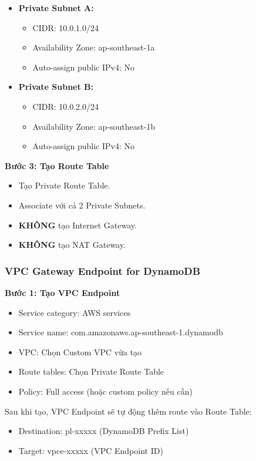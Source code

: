 \begin{itemize}
    \item \textbf{Private Subnet A:}
    \begin{itemize}
        \item CIDR: 10.0.1.0/24
        \item Availability Zone: ap-southeast-1a
        \item Auto-assign public IPv4: No
    \end{itemize}
    \item \textbf{Private Subnet B:}
    \begin{itemize}
        \item CIDR: 10.0.2.0/24
        \item Availability Zone: ap-southeast-1b
        \item Auto-assign public IPv4: No
    \end{itemize}
\end{itemize}

\textbf{Bước 3: Tạo Route Table}

\begin{itemize}
    \item Tạo Private Route Table.
    \item Associate với cả 2 Private Subnets.
    \item \textbf{KHÔNG} tạo Internet Gateway.
    \item \textbf{KHÔNG} tạo NAT Gateway.
\end{itemize}

\subsubsection{VPC Gateway Endpoint for DynamoDB}

\textbf{Bước 1: Tạo VPC Endpoint}

\begin{itemize}
    \item Service category: AWS services
    \item Service name: com.amazonaws.ap-southeast-1.dynamodb
    \item VPC: Chọn Custom VPC vừa tạo
    \item Route tables: Chọn Private Route Table
    \item Policy: Full access (hoặc custom policy nếu cần)
\end{itemize}

Sau khi tạo, VPC Endpoint sẽ tự động thêm route vào Route Table:
\begin{itemize}
    \item Destination: pl-xxxxx (DynamoDB Prefix List)
    \item Target: vpce-xxxxx (VPC Endpoint ID)
\end{itemize}

